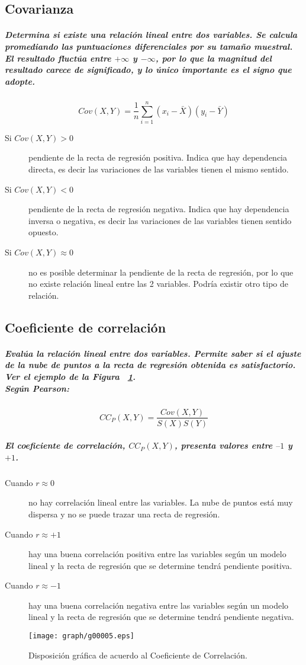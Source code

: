 \subsection{Covarianza}
\subparagraph{
Determina si existe una relación lineal entre dos variables. Se calcula promediando las puntuaciones diferenciales por su tamaño muestral. El resultado fluctúa entre $+\infty$ y $-\infty$, por lo que la magnitud del resultado carece de significado, y lo único importante es el signo que adopte.
}
\begin{equation}
Cov(X,Y)=\frac{1}{n}\sum_{i=1}^n(x_{i}-\bar{X})(y_{i}-\bar{Y})
\end{equation}
\begin{description}
\item[Si $Cov(X,Y)>0$]
pendiente de la recta de regresión positiva. Indica que hay dependencia directa, es decir las variaciones de las variables tienen el mismo sentido.
\item[Si $Cov(X,Y)<0$]
pendiente de la recta de regresión negativa. Indica que hay dependencia inversa o negativa, es decir las variaciones de las variables tienen sentido opuesto.
\item[Si $Cov(X,Y)\approx0$]
no es posible determinar la pendiente de la recta de regresión, por lo que no existe relación lineal entre las 2 variables. Podría existir otro tipo de relación.
\end{description}


\subsection{Coeficiente de correlación}
\subparagraph{
Evalúa la relación lineal entre dos variables. Permite saber si el ajuste de la nube de puntos a la recta de regresión obtenida es satisfactorio. Ver el ejemplo de la Figura ~\ref{fig:CoeficienteDeCorrelacion}.\\
Según Pearson:
}
\begin{equation}
CC_{P}(X,Y)=\frac{Cov(X,Y)}{S(X)S(Y)}
\end{equation}
\subparagraph{
El coeficiente de correlación, $CC_{P}(X,Y)$, presenta valores entre $–1$ y $+1$.
}
\begin{description}
\item[Cuando $r\approx0$]
no hay correlación lineal entre las variables. La nube de puntos está muy dispersa y no se puede trazar una recta de regresión.
\item[Cuando $r\approx+1$]
hay una buena correlación positiva entre las variables según un modelo lineal y la recta de regresión que se determine tendrá pendiente positiva.
\item[Cuando $r\approx-1$]
hay una buena correlación negativa entre las variables según un modelo lineal y la recta de regresión que se determine tendrá pendiente negativa.
\end{description}
\begin{figure}[ht]
\centering
\texttt{[image: graph/g00005.eps]}
\caption[Coeficiente de Correlación]{Disposición gráfica de acuerdo al Coeficiente de Correlación.}
\label{fig:CoeficienteDeCorrelacion}
\end{figure}




